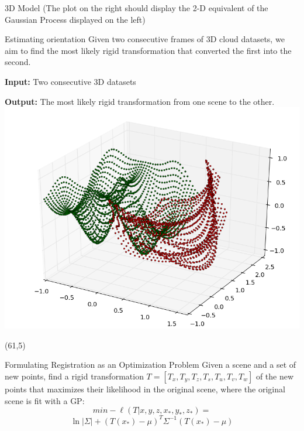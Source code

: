 \documentclass[final]{beamer}
\begin{document}
\begin{frame}{}
\begin{textblock}{27.5}
\begin{block}{3D Model}
(The plot on the right should display the 2-D equivalent of the Gaussian Process displayed on the left)
\end{block}

\begin{block}{Estimating orientation}
Given two consecutive frames of 3D cloud datasets, we aim to find the most likely rigid transformation that converted the first into the second.

\textbf{Input:} Two consecutive 3D datasets

\textbf{Output:} The most likely rigid transformation from one scene to the other.
\includegraphics[width=10in]{3DWorldModel.png}
\end{block}

\end{textblock}

\begin{textblock}{27}(61,5)




\begin{block}{Formulating Registration as an Optimization Problem}
Given a scene and a set of new points, find a rigid transformation $T = [T_x,T_y,T_z,T_s,T_u,T_v,T_w]$ of the new points 
that maximizes their likelihood in the original scene, where the original scene is fit with a GP:
$$min -\ell(T|x,y,z,x_*,y_*,z_*) =$$
$$ \ln|\Sigma| + (T(x_*) - \mu)^T \Sigma^{-1} (T(x_*) - \mu)$$

\end{block}



\end{textblock}
\end{frame}
\end{document}
